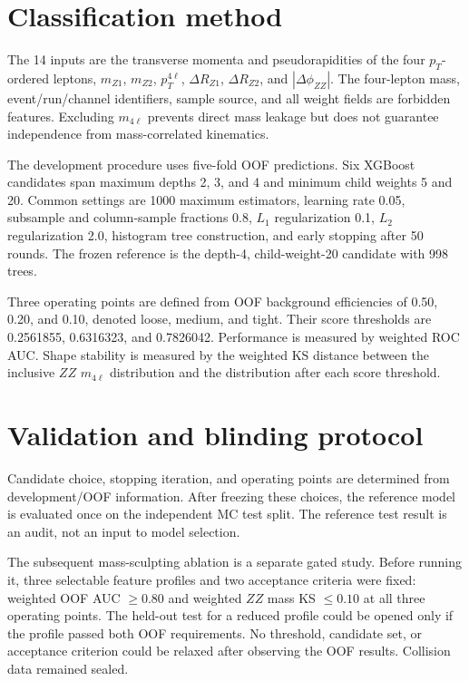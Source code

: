 \documentclass[11pt]{article}
\begin{document}
\section{Classification method}
\label{sec:method}

The 14 inputs are the transverse momenta and pseudorapidities of the four $p_T$-ordered leptons, $m_{Z1}$, $m_{Z2}$, $p_T^{4\ell}$, $\Delta R_{Z1}$, $\Delta R_{Z2}$, and $|\Delta\phi_{ZZ}|$. The four-lepton mass, event/run/channel identifiers, sample source, and all weight fields are forbidden features. Excluding $m_{4\ell}$ prevents direct mass leakage but does not guarantee independence from mass-correlated kinematics.

The development procedure uses five-fold OOF predictions. Six XGBoost candidates span maximum depths 2, 3, and 4 and minimum child weights 5 and 20. Common settings are 1000 maximum estimators, learning rate 0.05, subsample and column-sample fractions 0.8, $L_1$ regularization 0.1, $L_2$ regularization 2.0, histogram tree construction, and early stopping after 50 rounds. The frozen reference is the depth-4, child-weight-20 candidate with 998 trees.

Three operating points are defined from OOF background efficiencies of 0.50, 0.20, and 0.10, denoted loose, medium, and tight. Their score thresholds are 0.2561855, 0.6316323, and 0.7826042. Performance is measured by weighted ROC AUC. Shape stability is measured by the weighted KS distance between the inclusive $ZZ$ $m_{4\ell}$ distribution and the distribution after each score threshold.

\section{Validation and blinding protocol}
\label{sec:protocol}

Candidate choice, stopping iteration, and operating points are determined from development/OOF information. After freezing these choices, the reference model is evaluated once on the independent MC test split. The reference test result is an audit, not an input to model selection.

The subsequent mass-sculpting ablation is a separate gated study. Before running it, three selectable feature profiles and two acceptance criteria were fixed: weighted OOF AUC $\geq0.80$ and weighted $ZZ$ mass KS $\leq0.10$ at all three operating points. The held-out test for a reduced profile could be opened only if the profile passed both OOF requirements. No threshold, candidate set, or acceptance criterion could be relaxed after observing the OOF results. Collision data remained sealed.
\end{document}
